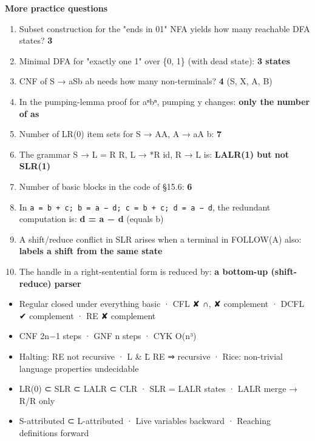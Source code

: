 \textbf{More practice questions}

\begin{enumerate}
\def\labelenumi{\arabic{enumi}.}
\setcounter{enumi}{50}
\tightlist
\item
  Subset construction for the "ends in 01" NFA yields how many reachable DFA states? \textbf{3}
\item
  Minimal DFA for "exactly one 1" over \{0, 1\} (with dead state): \textbf{3 states}
\item
  CNF of S → aSb \textbar{} ab needs how many non-terminals? \textbf{4} (S, X, A, B)
\item
  In the pumping-lemma proof for aⁿbⁿ, pumping y changes: \textbf{only the number of a\textquotesingle s}
\item
  Number of LR(0) item sets for S → AA, A → aA \textbar{} b: \textbf{7}
\item
  The grammar S → L = R \textbar{} R, L → *R \textbar{} id, R → L is: \textbf{LALR(1) but not SLR(1)}
\item
  Number of basic blocks in the code of §15.6: \textbf{6}
\item
  In \texttt{a\ =\ b\ +\ c;\ b\ =\ a\ −\ d;\ c\ =\ b\ +\ c;\ d\ =\ a\ −\ d}, the redundant computation is: \textbf{d = a − d} (equals b)
\item
  A shift/reduce conflict in SLR arises when a terminal in FOLLOW(A) also: \textbf{labels a shift from the same state}
\item
  The handle in a right-sentential form is reduced by: \textbf{a bottom-up (shift-reduce) parser}
\end{enumerate}

\begin{revbox}

\begin{itemize}
\tightlist
\item
  Regular closed under everything basic · CFL ✘ ∩, ✘ complement · DCFL ✔ complement · RE ✘ complement
\item
  CNF 2n−1 steps · GNF n steps · CYK O(n³)
\item
  Halting: RE not recursive · L \& L̄ RE ⇒ recursive · Rice: non-trivial language properties undecidable
\item
  LR(0) ⊂ SLR ⊂ LALR ⊂ CLR · SLR = LALR states · LALR merge → R/R only
\item
  S-attributed ⊂ L-attributed · Live variables backward · Reaching definitions forward
\end{itemize}

\end{revbox}
